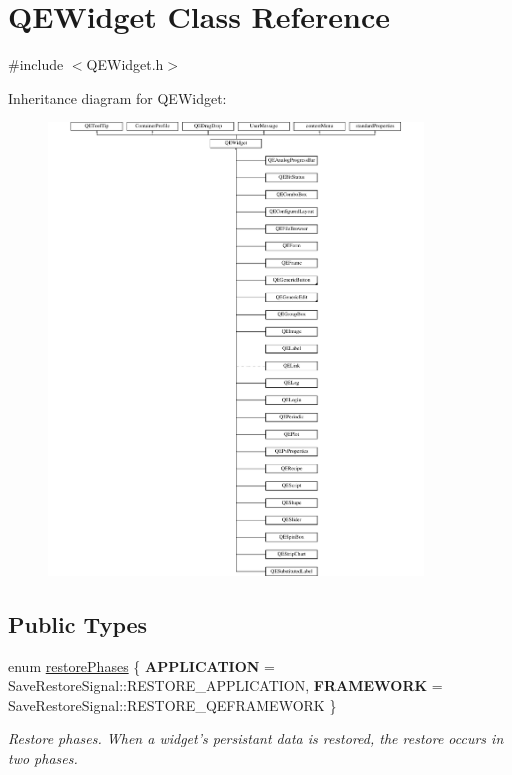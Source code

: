 \hypertarget{classQEWidget}{
\section{QEWidget Class Reference}
\label{classQEWidget}
}


{\ttfamily \#include $<$QEWidget.h$>$}

Inheritance diagram for QEWidget:\begin{figure}[H]
\begin{center}
\leavevmode
\includegraphics[height=12.000000cm]{classQEWidget}
\end{center}
\end{figure}
\subsection*{Public Types}
\begin{DoxyCompactItemize}
\item 
enum \hyperlink{classQEWidget_acff38ca69eed5b30a9d5f9d055e7a0b1}{restorePhases} \{ {\bfseries APPLICATION} =  SaveRestoreSignal::RESTORE\_\-APPLICATION, 
{\bfseries FRAMEWORK} =  SaveRestoreSignal::RESTORE\_\-QEFRAMEWORK
 \}
\begin{DoxyCompactList}\small\item\em Restore phases. When a widget's persistant data is restored, the restore occurs in two phases. \end{DoxyCompactList}\end{DoxyCompactItemize}
